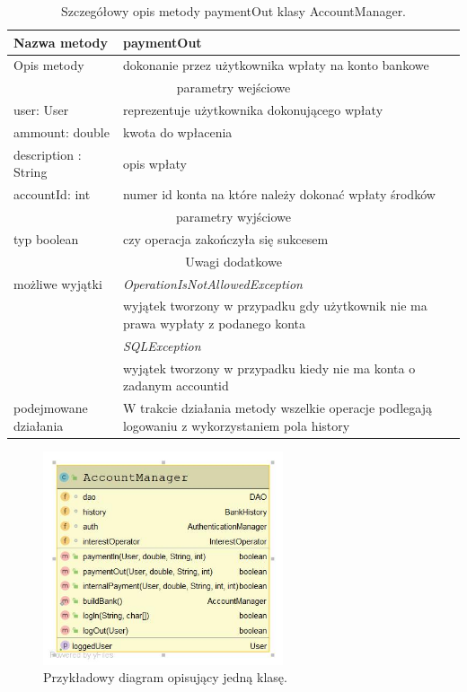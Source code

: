 \documentclass[12pt,a4paper]{article}
\begin{document}
\begin{table}[h!b]
\begin{center}
\begin{tabularx}{\textwidth}{|l|X|}
  \hline
  Nazwa metody  & paymentOut  \\\hline
  Opis metody   & dokonanie przez użytkownika wpłaty na konto bankowe\\\hline\hline
  \multicolumn{2}{|c|}{parametry wejściowe} \\\hline
  user: User            &  reprezentuje użytkownika dokonującego wpłaty  \\\hline
  ammount: double       &  kwota do wpłacenia  \\\hline
  description : String  & opis wpłaty \\\hline
  accountId: int        & numer id konta na które należy dokonać wpłaty środków \\\hline\hline
  \multicolumn{2}{|c|}{parametry wyjściowe}   \\\hline
  typ boolean &  czy operacja zakończyła się sukcesem\\\hline\hline
  \multicolumn{2}{|c|}{Uwagi dodatkowe}\\\hline
  możliwe wyjątki   & \textit{OperationIsNotAllowedException} \\
                    & wyjątek tworzony w przypadku gdy użytkownik nie ma prawa wypłaty z podanego konta\\
                    & \textit{SQLException}\\
                    & wyjątek tworzony w przypadku kiedy nie ma  konta o zadanym accountid\\\hline
  podejmowane działania & W trakcie działania metody wszelkie operacje  podlegają logowaniu z wykorzystaniem pola history\\
  \hline
\end{tabularx}
\caption{Szczegółowy opis metody paymentOut klasy AccountManager.}\label{Opis_Klasy}
\end{center}
\end{table}

\begin{figure}[!h]
\centering
\includegraphics[width = 200pt]{DiagramKlasy.jpg}
\caption{Przykładowy diagram opisujący jedną klasę.}\label{diagram_wybranej_klasy}
\end{figure}
\end{document}
